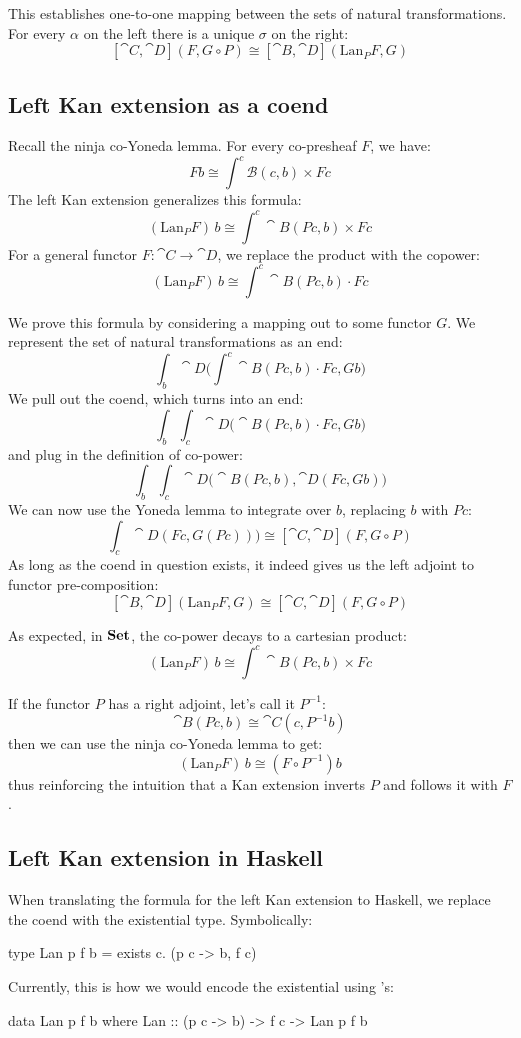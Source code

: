 \documentclass[DaoFP]{subfiles}
\begin{document}
This establishes one-to-one mapping between the sets of natural transformations. For every $\alpha$ on the left there is a unique $\sigma$ on the right:
\[  [\cat C, \cat D] (F, G \circ P) \cong [\cat B, \cat D](\text{Lan}_P F , G)  \]


\subsection{Left Kan extension as a coend}

Recall the ninja co-Yoneda lemma. For every co-presheaf $F$, we have:
\[ F b \cong \int^{c} \mathcal{B}(c, b) \times F c \]
The left Kan extension generalizes this formula:
\[ (\text{Lan}_P F)\, b \cong \int^{c} \cat B (P c, b) \times F c \]
For a general functor $F \colon \cat C \to \cat D$, we replace the product with the copower:
\[ (\text{Lan}_P F)\, b \cong \int^{c} \cat B(P c, b) \cdot F c \]

We prove this formula by considering a mapping out to some functor $G$. We represent the set of natural transformations as an end:
\[\int_b \cat D \big(\int^c \cat B(P c, b) \cdot F c, G b\big) \]
We pull out the coend, which turns into an end:
\[\int_b \int_c \cat D \big(\cat B(P c, b) \cdot F c, G b\big) \]
and plug in the definition of co-power:
\[\int_b \int_c \cat D \big(\cat B(P c, b), \cat D (F c, G b)\big) \]
We can now use the Yoneda lemma to integrate over $b$, replacing $b$ with $P c$:
\[\int_c \cat D (F c, G (P c))\big) \cong  [\cat C, \cat D] (F, G \circ P) \]
As long as the coend in question exists, it indeed gives us the left adjoint to functor pre-composition:
\[ [\cat B, \cat D](\text{Lan}_P F , G) \cong  [\cat C, \cat D] (F, G \circ P) \]

As expected, in $\mathbf{Set}$, the co-power decays to a cartesian product:
\[ (\text{Lan}_P F)\, b \cong \int^{c} \cat B (P c, b) \times F c \]

 If the functor $P$ has a right adjoint, let's call it $P^{-1}$:
 \[ \cat B(P c , b) \cong \cat C(c, P^{-1} b) \]
 then we can use the ninja co-Yoneda lemma to get:
 \[  (\text{Lan}_P F)\, b \cong (F \circ P^{-1}) b \]
 thus reinforcing the intuition that a Kan extension inverts $P$ and follows it with $F$.
 
\subsection{Left Kan extension in Haskell}

When translating the formula for the left Kan extension to Haskell, we replace the coend with the existential type. Symbolically:
 \begin{haskell}
type Lan p f b = exists c. (p c -> b, f c)
 \end{haskell}
Currently, this is how we would encode the existential using 's:
 \begin{haskell}
data Lan p f b where
   Lan :: (p c -> b) -> f c -> Lan p f b
 \end{haskell}
 
\end{document}
